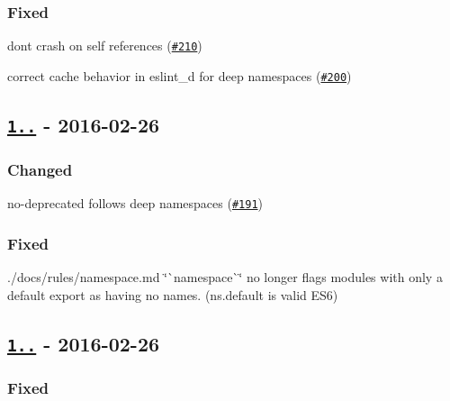 \subsubsection*{Fixed}


\begin{DoxyItemize}
\item don\textquotesingle{}t crash on self references (\href{https://github.com/benmosher/eslint-plugin-import/issues/210}{\tt \#210})
\item correct cache behavior in {\ttfamily eslint\+\_\+d} for deep namespaces (\href{https://github.com/benmosher/eslint-plugin-import/issues/200}{\tt \#200})
\end{DoxyItemize}

\subsection*{\href{https://github.com/benmosher/eslint-plugin-import/compare/v1.0.2...v1.0.3}{\tt 1..} -\/ 2016-\/02-\/26}

\subsubsection*{Changed}


\begin{DoxyItemize}
\item no-\/deprecated follows deep namespaces (\href{https://github.com/benmosher/eslint-plugin-import/issues/191}{\tt \#191})
\end{DoxyItemize}

\subsubsection*{Fixed}


\begin{DoxyItemize}
\item ./docs/rules/namespace.md \char`\"{}\`{}namespace\`{}\char`\"{} no longer flags modules with only a default export as having no names. (ns.\+default is valid E\+S6)
\end{DoxyItemize}

\subsection*{\href{https://github.com/benmosher/eslint-plugin-import/compare/v1.0.1...v1.0.2}{\tt 1..} -\/ 2016-\/02-\/26}

\subsubsection*{Fixed}


